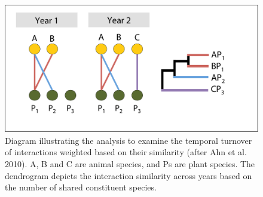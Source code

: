 \documentclass[12pt]{article}
\begin{document}
\doublespacing
\linenumbers

\renewcommand{\thesection}{S\arabic{section}} \setcounter{section}{0}
\renewcommand{\theequation}{S\arabic{equation}}
\setcounter{equation}{0} \renewcommand{\thetable}{S\arabic{table}}
\setcounter{table}{0} %
\renewcommand{\thefigure}{S\arabic{figure}} \setcounter{figure}{0}
\setcounter{page}{1}

\newcommand{\lkmcomment}[1] {
  \textcolor{red}{\it{[#1]}}
}




\begin{figure}
  \centering
  \includegraphics[width=.8\textwidth]{figures/scheme.pdf}
  \caption{Diagram illustrating the analysis to examine the temporal
    turnover of interactions weighted based on their similarity (after
    Ahn et al. 2010). A, B and C are animal species, and Ps are plant
    species. The dendrogram depicts the interaction similarity across
    years based on the number of shared constituent species.}
  \label{fig:methods}
\end{figure}
\clearpage
\end{document}
